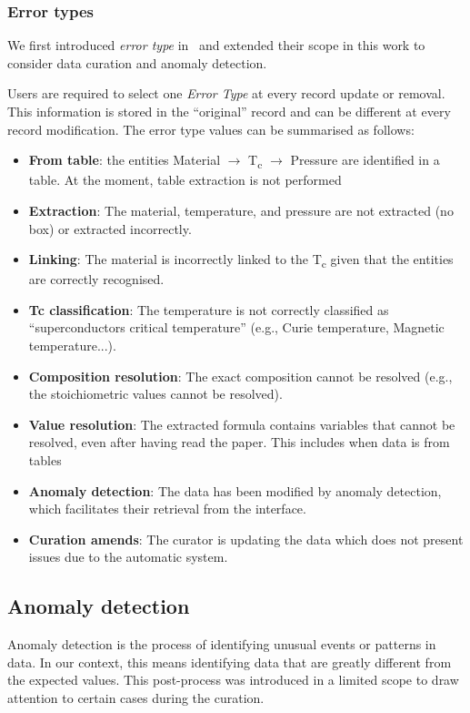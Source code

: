 \documentclass[]{interact}
\theoremstyle{plain} %
\theoremstyle{definition}
\theoremstyle{remark}
\begin{document}
\subsubsection{Error types}
\label{subsec:error-types}
We first introduced \emph{error type} in~\cite{lfoppiano2023automatic} and extended their scope in this work to consider data curation and anomaly detection. 

Users are required to select one \emph{Error Type} at every record update or removal. This information is stored in the ``original'' record and can be different at every record modification.
The error type values can be summarised as follows: 

\begin{itemize}
    \item \textbf{From table}: the entities Material $\rightarrow$ T\textsubscript{c} $\rightarrow$ Pressure are identified in a table. At the moment, table extraction is not performed
    \item \textbf{Extraction}: The material, temperature, and pressure are not extracted (no box) or extracted incorrectly. 
    \item \textbf{Linking}: The material is incorrectly linked to the T\textsubscript{c} given that the entities are correctly recognised.
    \item \textbf{Tc classification}: The temperature is not correctly classified as ``superconductors critical temperature'' (e.g., Curie temperature, Magnetic temperature...).
    \item \textbf{Composition resolution}: The exact composition cannot be resolved (e.g., the stoichiometric values cannot be resolved).
    \item \textbf{Value resolution}: The extracted formula contains variables that cannot be resolved, even after having read the paper. This includes when data is from tables
    \item \textbf{Anomaly detection}: The data has been modified by anomaly detection, which facilitates their retrieval from the interface.
    \item \textbf{Curation amends}: The curator is updating the data which does not present issues due to the automatic system.
\end{itemize}

\subsection{Anomaly detection}
\label{subsec:anomaly-detection}
Anomaly detection is the process of identifying unusual events or patterns in data. 
In our context, this means identifying data that are greatly different from the expected values.
This post-process was introduced in a limited scope to draw attention to certain cases during the curation.
\end{document}
